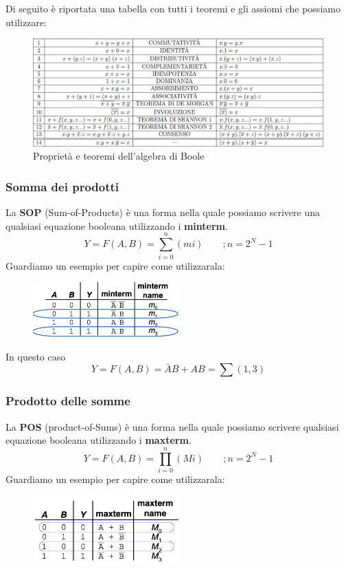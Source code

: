 \documentclass[../main.tex]{subfiles}
\begin{document}
Di seguito è riportata una tabella con tutti i teoremi e gli assiomi che possiamo utilizzare:
\begin{figure}[h]
    \centering
    \includegraphics[width=1\textwidth]{images/teoremiAlgebraBool.png}
    \caption{Proprietà e teoremi dell'algebra di Boole}
\end{figure}

\pagebreak
\subsubsection{Somma dei prodotti}
La \textbf{SOP} (Sum-of-Products) è una forma nella quale possiamo scrivere una qualsiasi equazione booleana utilizzando i \textbf{minterm}.
$$
    Y = F(A,B) = \sum_{i = 0}^{n}(mi)\phantom{--};n=2^N -1 
$$
Guardiamo un esempio per capire come utilizzarala:
\begin{figure}[h]
    \centering
    \includegraphics[width=0.5\textwidth]{images/sop.png}
\end{figure}

In questo caso
$$
    Y = F(A,B) = \bar{A}B + AB = \sum(1,3)
$$

\subsubsection{Prodotto delle somme}
La \textbf{POS} (product-of-Sums) è una forma nella quale possiamo scrivere qualsiasi equazione booleana utilizzando i \textbf{maxterm}.
$$
    Y = F(A,B) = \prod_{i = 0}^{n}(Mi)\phantom{--};n=2^N  -1
$$
Guardiamo un esempio per capire come utilizzarala:
\begin{figure}[h]
    \centering
    \includegraphics[width=0.5\textwidth]{images/pos.png}
\end{figure}
\end{document}
